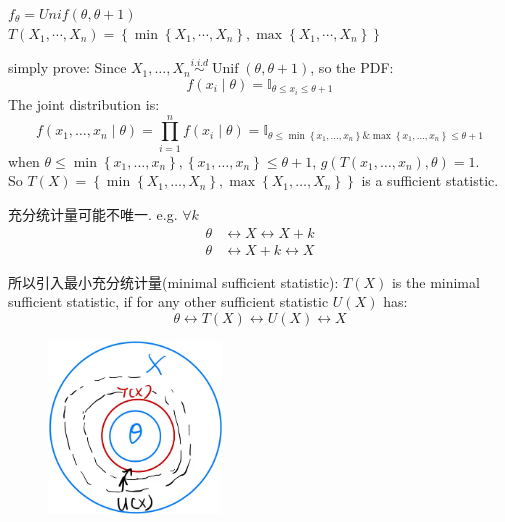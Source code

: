 \begin{example}
$f_{\theta}=Unif(\theta,\theta+1)$\\
$T(X_1,\cdots,X_n)=\left\{\min\left\{X_1,\cdots,X_n\right\},\max\left\{X_1,\cdots,X_n\right\}\right\}$

simply prove:
Since $X_1, \ldots, X_n\stackrel{i.i.d}{\sim}\operatorname{Unif}(\theta, \theta+1)$, so the PDF:
$$f\left(x_i \mid \theta\right)= \mathbb{I}_{\theta\leq x_i \leq \theta+1}$$
The joint distribution is:
$$f\left(x_1, \ldots, x_n \mid \theta\right) = \prod_{i=1}^n f\left(x_i \mid \theta\right) = \mathbb{I}_{\theta \leq \min \left\{x_1, \ldots, x_n\right\} \& \max \left\{x_1, \ldots, x_n\right\} \leq \theta+1}$$
when $\theta \leq \min \left\{x_1, \ldots, x_n\right\}, \left\{x_1, \ldots, x_n\right\} \leq \theta+1$, $g\left(T\left(x_1, \ldots, x_n\right), \theta\right)=1$. \\
So $T(X)=\left\{\min \left\{X_1, \ldots, X_n\right\}, \max \left\{X_1, \ldots, X_n\right\}\right\}$ is a sufficient statistic.

\end{example}

\begin{proposition}
充分统计量可能不唯一. e.g. $\forall k$
\begin{align*}
\theta &\leftrightarrow X \leftrightarrow X+k \\
\theta &\leftrightarrow X+k \leftrightarrow X
\end{align*}
\end{proposition}

\begin{definition}
所以引入最小充分统计量(minimal sufficient statistic):
$T(X)$ is the minimal sufficient statistic, if for any other sufficient statistic $U(X)$ has:
$$\theta\leftrightarrow T(X)\leftrightarrow U(X)\leftrightarrow X$$
\begin{figure}[htbp]
    \centering
    \includegraphics[width=0.41\textwidth]{./figures/chapter1/minimum_sufficient_statistic.png}
\end{figure}
\end{definition}

